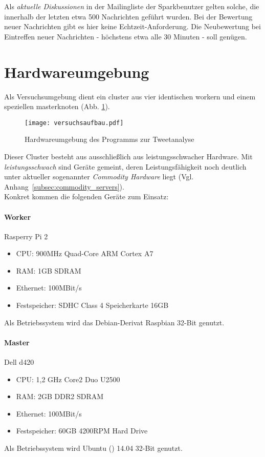 Als \textit{aktuelle Diskussionen} in der Mailingliste der Sparkbenutzer gelten solche, die innerhalb der letzten etwa 500 Nachrichten geführt wurden. Bei der Bewertung neuer Nachrichten gibt es hier keine Echtzeit-Anforderung. Die Neubewertung bei Eintreffen neuer Nachrichten - höchstens etwa alle 30 Minuten - soll genügen.\\

\section{Hardwareumgebung}

Als Versuchsumgebung dient ein \gls{cluster} aus vier identischen \gls{worker}n und einem speziellen \gls{master}knoten (Abb. \ref{figure:versuchsaufbau}).

\begin{figure}[h]
	\centering
  \texttt{[image: versuchsaufbau.pdf]}
	\caption{Hardwareumgebung des Programms zur Tweetanalyse}
	\label{figure:versuchsaufbau}
\end{figure}

Dieser Cluster besteht aus ausschließlich aus leistungsschwacher Hardware. Mit \textit{leistungsschwach} sind Geräte gemeint, deren Leistungsfähigkeit noch deutlich unter aktueller sogenannter \textit{Commodity Hardware} liegt (Vgl. Anhang~\ref{subsec:commodity_servers}).\\

Konkret kommen die folgenden Geräte zum Einsatz:

\paragraph{Worker}
Rasperry Pi 2
\begin{itemize}
	\item CPU: 900MHz Quad-Core ARM Cortex A7
	\item RAM: 1GB SDRAM
	\item Ethernet: 100MBit/s
	\item Festspeicher: SDHC Class 4 Speicherkarte 16GB
\end{itemize}
Als Betriebssystem wird das Debian-Derivat Raspbian\cite{raspbian} 32-Bit genutzt.

\paragraph{Master}
Dell d420
\begin{itemize}
	\item CPU: 1,2 GHz Core2 Duo U2500
	\item RAM: 2GB DDR2 SDRAM
	\item Ethernet: 100MBit/s
	\item Festspeicher: 60GB 4200RPM Hard Drive
\end{itemize}
Als Betriebssystem wird Ubuntu (\cite{ubuntu}) 14.04 32-Bit genutzt.

